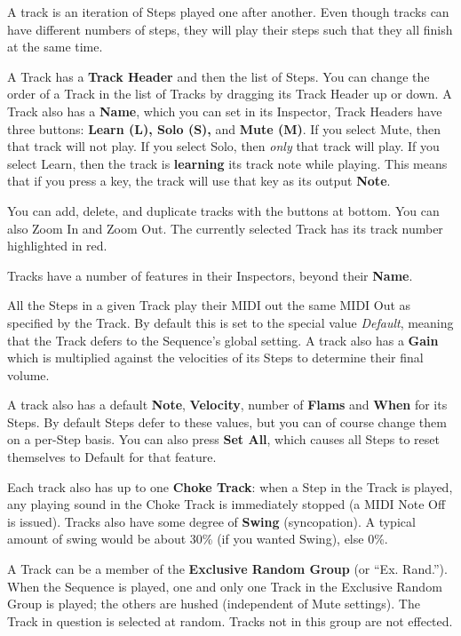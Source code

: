 \documentclass[twoside,10pt]{article}
\begin{document}
A track is an iteration of Steps played one after another.  Even though tracks can have different numbers of steps, they will play their steps such that they all finish at the same time.

A Track has a {\bf Track Header} and then the list of Steps.  You can change the order of a Track in the list of Tracks by dragging its Track Header up or down.  A Track also has a {\bf Name}, which you can set in its Inspector,  Track Headers have three buttons: {\bf Learn (L), Solo (S),} and {\bf Mute (M)}.  If you select Mute, then that track will not play.  If you select Solo, then {\it only} that track will play.  If you select Learn, then the track is {\bf learning} its track note while playing.  This means that if you press a key, the track will use that key as its output {\bf Note}.     

You can add, delete, and duplicate tracks with the buttons at bottom.  You can also Zoom In and Zoom Out.  The currently selected Track has its track number highlighted in red.

Tracks have a number of features in their Inspectors, beyond their {\bf Name}.

All the Steps in a given Track play their MIDI out the same MIDI Out as specified by the Track.  By default this is set to the special value {\it Default}, meaning that the Track defers to the Sequence's global setting.  A track also has a {\bf Gain} which is multiplied against the velocities of its Steps to determine their final volume.  

A track also has a default {\bf Note}, {\bf Velocity}, number of {\bf Flams} and {\bf When} for its Steps.  By default Steps defer to these values, but you can of course change them on a per-Step basis.  You can also press {\bf Set All}, which causes all Steps to reset themselves to Default for that feature.

Each track also has up to one {\bf Choke Track}: when a Step in the Track is played, any playing sound in the Choke Track is immediately stopped (a MIDI Note Off is issued).  Tracks also have some degree of {\bf Swing} (syncopation).  A typical amount of swing would be about 30\% (if you wanted Swing), else 0\%.

A Track can be a member of the {\bf Exclusive Random Group} (or ``Ex. Rand.'').  When the Sequence is played, one and only one Track in the Exclusive Random Group is played; the others are hushed (independent of Mute settings).  The Track in question is selected at random. Tracks not in this group are not effected.
\end{document}

